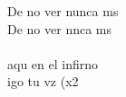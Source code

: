 \begin{cancion}[Miedo][M Clan]
\begin{chorus}
	De no ver nunca ms         \\
	De no ver nnca ms             \\
\jump\\
	 aqu en el infirno  \\
	  igo tu vz (x2\\
	\end{chorus}%
	\jump\\
	         \\
\end{cancion}%

